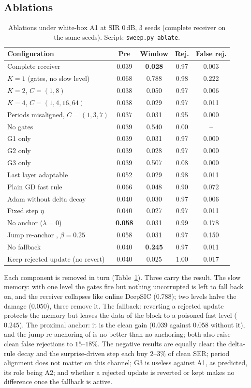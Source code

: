 \documentclass[journal]{IEEEtran}
\begin{document}
\subsection{Ablations}\label{sec:ablate}
\begin{table}[t]
\centering\caption{Ablations under white-box A1 at SIR 0\,dB, 3 seeds (complete receiver
on the same seeds). Script: \texttt{sweep.py ablate}.}\label{tab:ablate}
\scriptsize
\begin{tabular}{@{}lcccc@{}}
\toprule
Configuration & Pre & Window & Rej. & False rej.\\
\midrule
Complete receiver & 0.039 & \textbf{0.028} & 0.97 & 0.003\\
$K=1$ (gates, no slow level) & 0.068 & 0.788 & 0.98 & 0.222\\
$K=2$, $C=(1,8)$ & 0.038 & 0.050 & 0.97 & 0.006\\
$K=4$, $C=(1,4,16,64)$ & 0.038 & 0.029 & 0.97 & 0.011\\
Periods misaligned, $C=(1,3,7)$ & 0.037 & 0.031 & 0.95 & 0.000\\
No gates & 0.039 & 0.540 & 0.00 & --\\
G1 only & 0.039 & 0.031 & 0.97 & 0.000\\
G2 only & 0.039 & 0.028 & 0.97 & 0.000\\
G3 only & 0.039 & 0.507 & 0.08 & 0.000\\
Last layer adaptable & 0.052 & 0.029 & 0.98 & 0.011\\
Plain GD fast rule & 0.066 & 0.048 & 0.90 & 0.072\\
Adam without delta decay & 0.040 & 0.030 & 0.97 & 0.006\\
Fixed step $\eta$ & 0.040 & 0.027 & 0.97 & 0.011\\
No anchor ($\lambda=0$) & \textbf{0.058} & 0.031 & 0.99 & 0.178\\
Jump re-anchor \cite{behrouz2025nested}, $\beta=0.25$ & 0.058 & 0.031 & 0.97 & 0.150\\
No fallback & 0.040 & \textbf{0.245} & 0.97 & 0.011\\
Keep rejected update (no revert) & 0.040 & 0.025 & 1.00 & 0.017\\
\bottomrule
\end{tabular}
\end{table}
Each component is removed in turn (Table~\ref{tab:ablate}). Three carry the result. The
slow memory: with one level the gates fire but nothing uncorrupted is left to fall back
on, and the receiver collapses like online DeepSIC ($0.788$); two levels halve the damage
($0.050$), three remove it. The fallback: reverting a rejected update protects the memory
but leaves the data of the block to a poisoned fast level ($0.245$). The proximal anchor:
it is the clean gain ($0.039$ against $0.058$ without it), and the jump re-anchoring of
\cite{behrouz2025nested} is no better than no anchoring; both also raise clean false
rejections to $15$--$18\%$. The negative results are equally clear: the delta-rule decay
and the surprise-driven step each buy $2$--$3\%$ of clean SER; period alignment does not
matter on this channel; G3 is useless against A1, as predicted, its role being A2; and
whether a rejected update is reverted or kept makes no difference once the fallback is
active.
\end{document}
